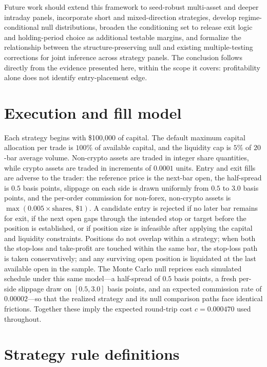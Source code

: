 \documentclass[preprint,12pt]{elsarticle}
\theoremstyle{definition}
\begin{document}
Future work should extend this framework to seed-robust multi-asset and deeper intraday panels, incorporate short and mixed-direction strategies, develop regime-conditional null distributions, broaden the conditioning set to release exit logic and holding-period choice as additional testable margins, and formalize the relationship between the structure-preserving null and existing multiple-testing corrections for joint inference across strategy panels. The conclusion follows directly from the evidence presented here, within the scope it covers: profitability alone does not identify entry-placement edge.

\appendix

\section{Execution and fill model}
\label{app:execution}

Each strategy begins with \$100{,}000 of capital. The default maximum capital allocation per trade is $100\%$ of available capital, and the liquidity cap is $5\%$ of $20$-bar average volume. Non-crypto assets are traded in integer share quantities, while crypto assets are traded in increments of $0.0001$ units. Entry and exit fills are adverse to the trader: the reference price is the next-bar open, the half-spread is $0.5$ basis points, slippage on each side is drawn uniformly from $0.5$ to $3.0$ basis points, and the per-order commission for non-forex, non-crypto assets is $\max(0.005\times\text{shares},\,\$1)$. A candidate entry is rejected if no later bar remains for exit, if the next open gaps through the intended stop or target before the position is established, or if position size is infeasible after applying the capital and liquidity constraints. Positions do not overlap within a strategy; when both the stop-loss and take-profit are touched within the same bar, the stop-loss path is taken conservatively; and any surviving open position is liquidated at the last available open in the sample. The Monte Carlo null reprices each simulated schedule under this same model---a half-spread of $0.5$ basis points, a fresh per-side slippage draw on $[0.5,3.0]$ basis points, and an expected commission rate of $0.00002$---so that the realized strategy and its null comparison paths face identical frictions. Together these imply the expected round-trip cost $c=0.000470$ used throughout.

\section{Strategy rule definitions}
\label{app:strategy_rules}
\end{document}
